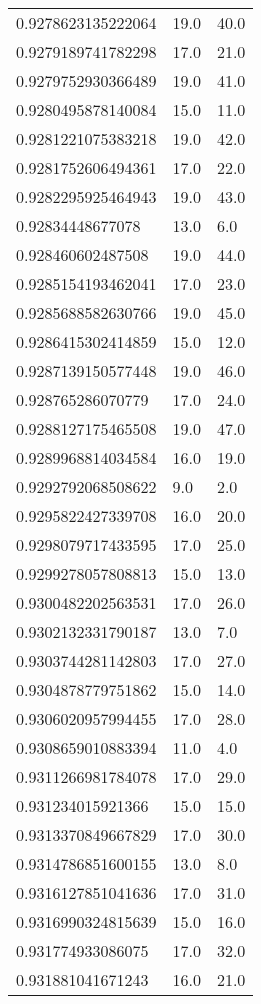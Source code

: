 \begin{center}
\begin{supertabular}[H]{p{0.30\textwidth}p{0.05\textwidth}p{0.05\textwidth}}
0.9278623135222064 & 19.0 & 40.0 \\ 
0.9279189741782298 & 17.0 & 21.0 \\ 
0.9279752930366489 & 19.0 & 41.0 \\ 
0.9280495878140084 & 15.0 & 11.0 \\ 
0.9281221075383218 & 19.0 & 42.0 \\ 
0.9281752606494361 & 17.0 & 22.0 \\ 
0.9282295925464943 & 19.0 & 43.0 \\ 
0.92834448677078 & 13.0 & 6.0 \\ 
0.928460602487508 & 19.0 & 44.0 \\ 
0.9285154193462041 & 17.0 & 23.0 \\ 
0.9285688582630766 & 19.0 & 45.0 \\ 
0.9286415302414859 & 15.0 & 12.0 \\ 
0.9287139150577448 & 19.0 & 46.0 \\ 
0.928765286070779 & 17.0 & 24.0 \\ 
0.9288127175465508 & 19.0 & 47.0 \\ 
0.9289968814034584 & 16.0 & 19.0 \\ 
0.9292792068508622 & 9.0 & 2.0 \\ 
0.9295822427339708 & 16.0 & 20.0 \\ 
0.9298079717433595 & 17.0 & 25.0 \\ 
0.9299278057808813 & 15.0 & 13.0 \\ 
0.9300482202563531 & 17.0 & 26.0 \\ 
0.9302132331790187 & 13.0 & 7.0 \\ 
0.9303744281142803 & 17.0 & 27.0 \\ 
0.9304878779751862 & 15.0 & 14.0 \\ 
0.9306020957994455 & 17.0 & 28.0 \\ 
0.9308659010883394 & 11.0 & 4.0 \\ 
0.9311266981784078 & 17.0 & 29.0 \\ 
0.931234015921366 & 15.0 & 15.0 \\ 
0.9313370849667829 & 17.0 & 30.0 \\ 
0.9314786851600155 & 13.0 & 8.0 \\ 
0.9316127851041636 & 17.0 & 31.0 \\ 
0.9316990324815639 & 15.0 & 16.0 \\ 
0.931774933086075 & 17.0 & 32.0 \\ 
0.931881041671243 & 16.0 & 21.0 \\ 

\end{supertabular}
\end{center}
